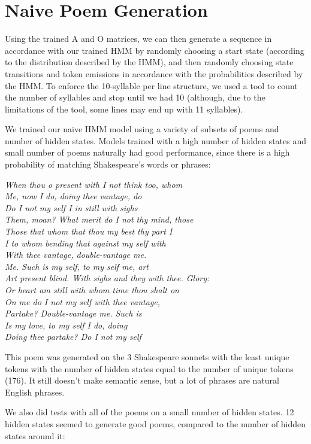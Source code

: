 \section{Naive Poem Generation}
\par Using the trained A and O matrices, we can then generate a sequence in accordance with our trained HMM by randomly choosing a start state (according to the distribution described by the HMM), and then randomly choosing state transitions and token emissions in accordance with the probabilities described by the HMM. To enforce the 10-syllable per line structure, we used a tool to count the number of syllables and stop until we had 10 (although, due to the limitations of the tool, some lines may end up with 11 syllables). 
\par We trained our naive HMM model using a variety of subsets of poems and number of hidden states. Models trained with a high number of hidden states and small number of poems naturally had good performance, since there is a high probability of matching Shakespeare's words or phrases:

\setlength{\leftskip}{3cm}

\noindent\textit{
When thou o present with I not think too, whom \\
Me, now I do, doing thee vantage, do \\
Do I not my self I in still with sighs \\
Them, moan? What merit do I not thy mind, those \\
Those that whom that thou my best thy part I \\
I to whom bending that against my self with \\
With thee vantage, double-vantage me. \\
Me. Such is my self, to my self me, art \\
Art present blind. With sighs and they with thee. Glory: \\
Or heart am still with whom time thou shalt on \\
On me do I not my self with thee vantage, \\
Partake? Double-vantage me. Such is \\
Is my love, to my self I do, doing \\
Doing thee partake? Do I not my self
}

\setlength{\leftskip}{0pt}

This poem was generated on the 3 Shakespeare sonnets with the least unique tokens with the number of hidden states equal to the number of unique tokens (176). It still doesn't make semantic sense, but a lot of phrases are natural English phrases.
\par We also did tests with all of the poems on a small number of hidden states. 12 hidden states seemed to generate good poems, compared to the number of hidden states around it:

